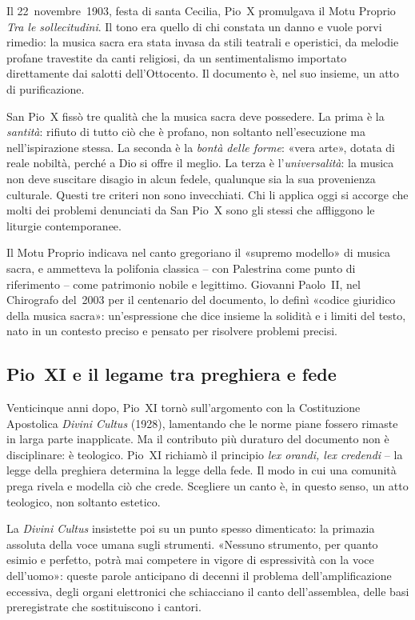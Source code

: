 \documentclass[12pt,a4paper]{article}
\begin{document}
	Il 22~novembre~1903, festa di santa Cecilia, Pio~X promulgava il Motu Proprio
	\emph{Tra le sollecitudini}. Il tono era quello di chi constata un danno e vuole
	porvi rimedio: la musica sacra era stata invasa da stili teatrali e operistici,
	da melodie profane travestite da canti religiosi, da un sentimentalismo importato
	direttamente dai salotti dell'Ottocento. Il documento è, nel suo insieme, un atto
	di purificazione.
	
	San Pio~X fissò tre qualità che la musica sacra deve possedere. La prima è la
	\emph{santità}: rifiuto di tutto ciò che è profano, non soltanto
	nell'esecuzione ma nell'ispirazione stessa. La seconda è la \emph{bontà delle
		forme}: «vera arte», dotata di reale nobiltà, perché a Dio si offre il meglio.
	La terza è l'\emph{universalità}: la musica non deve suscitare disagio in alcun
	fedele, qualunque sia la sua provenienza culturale. Questi tre criteri non sono
	invecchiati. Chi li applica oggi si accorge che molti dei problemi denunciati da
	San Pio~X sono gli stessi che affliggono le liturgie contemporanee.
	
	Il Motu Proprio indicava nel canto gregoriano il «supremo modello» di musica
	sacra, e ammetteva la polifonia classica -- con Palestrina come punto di
	riferimento -- come patrimonio nobile e legittimo. Giovanni Paolo~II, nel
	Chirografo del~2003 per il centenario del documento, lo definì «codice giuridico
	della musica sacra»: un'espressione che dice insieme la solidità e i limiti del
	testo, nato in un contesto preciso e pensato per risolvere problemi precisi.
	
	\subsection{Pio~XI e il legame tra preghiera e fede}
	
	Venticinque anni dopo, Pio~XI tornò sull'argomento con la Costituzione
	Apostolica \emph{Divini Cultus} (1928), lamentando che le norme piane fossero
	rimaste in larga parte inapplicate. Ma il contributo più duraturo del documento
	non è disciplinare: è teologico. Pio~XI richiamò il principio \emph{lex orandi,
		lex credendi} -- la legge della preghiera determina la legge della fede. Il modo
	in cui una comunità prega rivela e modella ciò che crede. Scegliere un canto è,
	in questo senso, un atto teologico, non soltanto estetico.
	
	La \emph{Divini Cultus} insistette poi su un punto spesso dimenticato: la
	primazia assoluta della voce umana sugli strumenti. «Nessuno strumento, per
	quanto esimio e perfetto, potrà mai competere in vigore di espressività con la
	voce dell'uomo»: queste parole anticipano di decenni il problema
	dell'amplificazione eccessiva, degli organi elettronici che schiacciano il canto
	dell'assemblea, delle basi preregistrate che sostituiscono i cantori.
	
\end{document}
